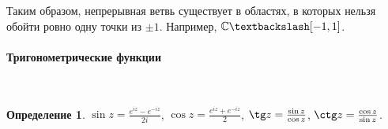 \documentclass[11pt,openany,a4paper]{scrartcl}
\theoremstyle{plain}
\theoremstyle{definition}
\newtheorem{definition}[theorem]{Определение}
\newcommand\mb{\mathbb}
\newcommand{\complex}{\mb C}
\newcommand\lparagraph[1]{\paragraph{#1}\mbox{}\\}
\begin{document}
Таким образом, непрерывная ветвь существует в областях, в которых нельзя обойти ровно одну точки из $\pm 1$. Например,
$\complex \textbackslash [-1, 1]$.

\lparagraph{Тригонометрические функции}

\begin{definition}
	$\sin z = \frac{e^{iz} - e^{-iz}}{2i}$, $\cos z = \frac{e^{iz} + e^{-iz}}{2}$, $\tg z = \frac{\sin z}{\cos z}$,
	$\ctg z = \frac{\cos z}{\sin z}$.
\end{definition}
\end{document}
